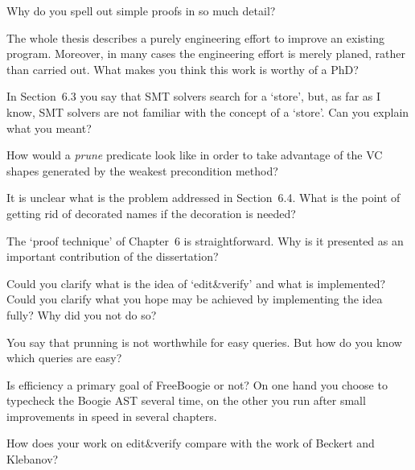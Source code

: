 \Q Why do you spell out simple proofs in so much detail?

\Q The whole thesis describes a purely engineering effort to improve an
existing program. Moreover, in many cases the engineering effort is merely
planed, rather than carried out. What makes you think this work is worthy
of a PhD?

\Q In Section~6.3 you say that SMT solvers search for a `store', but, as
far as I know, SMT solvers are not familiar with the concept of a `store'.
Can you explain what you meant?

\Q How would a {\it prune\/} predicate look like in order to take advantage
of the VC shapes generated by the weakest precondition method?

\Q It is unclear what is the problem addressed in Section~6.4. What is the
point of getting rid of decorated names if the decoration is needed?


\Q The `proof technique' of Chapter~6 is straightforward. Why is it
presented as an important contribution of the dissertation?


\Q Could you clarify what is the idea of `edit\&verify' and what is
implemented? Could you clarify what you hope may be achieved by
implementing the idea fully? Why did you not do so?

\Q You say that prunning is not worthwhile for easy queries. But how do you
know which queries are easy?


\Q Is efficiency a primary goal of FreeBoogie or not? On one hand you choose
to typecheck the Boogie AST several time, on the other you run after small
improvements in speed in several chapters.


\Q How does your work on edit\&verify compare with the work of Beckert and
Klebanov?

